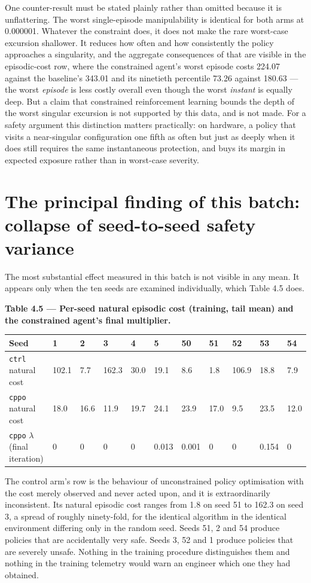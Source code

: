 One counter-result must be stated plainly rather than omitted because it is unflattering. The
worst single-episode manipulability is identical for both arms at 0.000001. Whatever the
constraint does, it does not make the rare worst-case excursion shallower. It reduces how often
and how consistently the policy approaches a singularity, and the aggregate consequences of that
are visible in the episodic-cost row, where the constrained agent's worst episode costs 224.07
against the baseline's 343.01 and its ninetieth percentile 73.26 against 180.63 --- the worst
\emph{episode} is less costly overall even though the worst \emph{instant} is equally deep. But a claim that
constrained reinforcement learning bounds the depth of the worst singular excursion is not
supported by this data, and is not made. For a safety argument this distinction matters
practically: on hardware, a policy that visits a near-singular configuration one fifth as often but
just as deeply when it does still requires the same instantaneous protection, and buys its margin
in expected exposure rather than in worst-case severity.


\section{The principal finding of this batch: collapse of seed-to-seed safety variance}\label{sec:r-variance}

The most substantial effect measured in this batch is not visible in any mean. It appears only
when the ten seeds are examined individually, which Table 4.5 does.

\textbf{Table 4.5 --- Per-seed natural episodic cost (training, tail mean) and the constrained agent's
final multiplier.}

\begin{longtable}[]{@{}lllllllllll@{}}
\toprule
Seed & 1 & 2 & 3 & 4 & 5 & 50 & 51 & 52 & 53 & 54\tabularnewline
\midrule
\endhead
\texttt{ctrl} natural cost & 102.1 & 7.7 & 162.3 & 30.0 & 19.1 & 8.6 & 1.8 & 106.9 & 18.8 & 7.9\tabularnewline
\texttt{cppo} natural cost & 18.0 & 16.6 & 11.9 & 19.7 & 24.1 & 23.9 & 17.0 & 9.5 & 23.5 & 12.0\tabularnewline
\texttt{cppo} \(\lambda\) (final iteration) & 0 & 0 & 0 & 0 & 0.013 & 0.001 & 0 & 0 & 0.154 & 0\tabularnewline
\bottomrule
\end{longtable}

The control arm's row is the behaviour of unconstrained policy optimisation with the cost merely
observed and never acted upon, and it is extraordinarily inconsistent. Its natural episodic cost
ranges from 1.8 on seed 51 to 162.3 on seed 3, a spread of roughly ninety-fold, for the identical
algorithm in the identical environment differing only in the random seed. Seeds 51, 2 and 54
produce policies that are accidentally very safe. Seeds 3, 52 and 1 produce policies that are
severely unsafe. Nothing in the training procedure distinguishes them and nothing in the training
telemetry would warn an engineer which one they had obtained.


